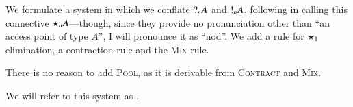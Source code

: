 \documentclass[twocolumn]{article}
\begin{document}
We formulate a system in which we conflate $\give[n]{A}$ and $\take[n]{A}$,
following \citet{atkey2016} in calling this connective $\nod[n]{A}$---though,
since they provide no pronunciation other than ``an access point of type $A$'',
I will pronounce it as ``nod''.
We add a rule for $\nod[1]{}$ elimination, a contraction rule and the
\textsc{Mix} rule.
\begin{center}
  \begin{proofbox}
    \SYM{\nod{}}
  \end{proofbox}
  \begin{proofbox}
  \end{proofbox}
\end{center}
There is no reason to add \textsc{Pool}, as it is derivable from \textsc{Contract}
and \textsc{Mix}.
\begin{proofblock}
\end{proofblock}
We will refer to this system as \ndcp.
\end{document}
